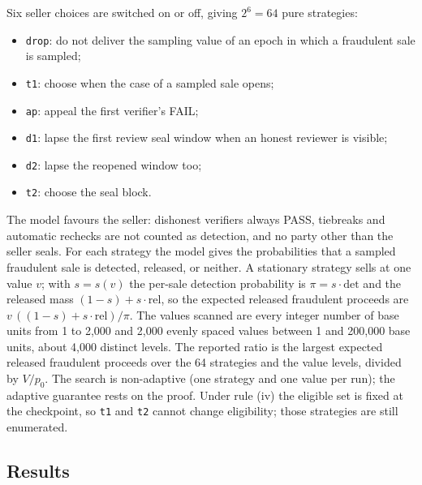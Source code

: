 \documentclass[10pt,a4paper]{article}
\theoremstyle{plain}
\theoremstyle{remark}
\begin{document}
Six seller choices are switched on or off, giving $2^6=64$ pure strategies:
\begin{itemize}
\item \texttt{drop}: do not deliver the sampling value of an epoch in which a fraudulent sale is sampled;
\item \texttt{t1}: choose when the case of a sampled sale opens;
\item \texttt{ap}: appeal the first verifier's FAIL;
\item \texttt{d1}: lapse the first review seal window when an honest reviewer is visible;
\item \texttt{d2}: lapse the reopened window too;
\item \texttt{t2}: choose the seal block.
\end{itemize}
The model favours the seller: dishonest verifiers always PASS, tiebreaks and automatic rechecks are not counted as detection, and no party other than the seller seals. For each strategy the model gives the probabilities that a sampled fraudulent sale is detected, released, or neither. A stationary strategy sells at one value $v$; with $s=s(v)$ the per-sale detection probability is $\pi=s\cdot\mathrm{det}$ and the released mass $(1-s)+s\cdot\mathrm{rel}$, so the expected released fraudulent proceeds are $v\,((1-s)+s\cdot\mathrm{rel})/\pi$. The values scanned are every integer number of base units from 1 to 2,000 and 2,000 evenly spaced values between 1 and 200,000 base units, about 4,000 distinct levels. The reported ratio is the largest expected released fraudulent proceeds over the 64 strategies and the value levels, divided by $V/p_0$. The search is non-adaptive (one strategy and one value per run); the adaptive guarantee rests on the proof. Under rule (iv) the eligible set is fixed at the checkpoint, so \texttt{t1} and \texttt{t2} cannot change eligibility; those strategies are still enumerated.

\subsection{Results}
\end{document}
